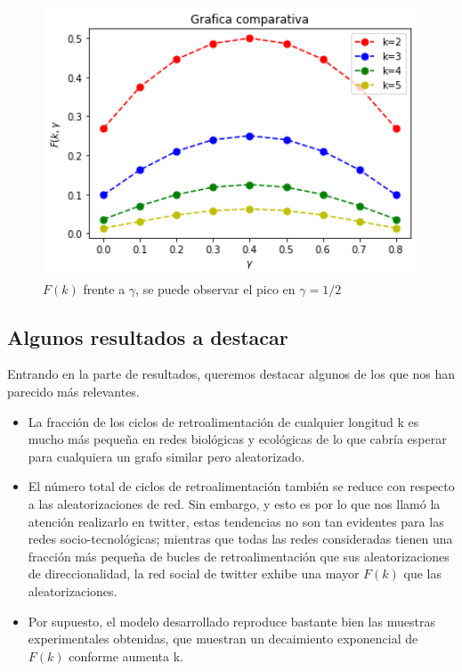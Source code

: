 \documentclass[1p]{elsarticle}
\begin{document}
\begin{figure}
	\centering
	\includegraphics[width=12cm]{graf_1.png}
	\caption{$F(k)$ frente a $\gamma$, se puede observar el pico en $\gamma=1/2$}
	\label{h}
\end{figure}




\subsection{Algunos resultados a destacar}
Entrando en la parte de resultados, queremos destacar algunos de los que nos han parecido más relevantes.
\begin{itemize}
	\item La fracción de los ciclos de retroalimentación de cualquier longitud k es mucho más pequeña en redes biológicas y ecológicas de lo que cabría esperar para cualquiera un grafo similar pero aleatorizado.
	\item El número total de ciclos de retroalimentación también se reduce 
	con respecto a las aleatorizaciones de red. Sin embargo, y esto es por lo que nos llamó la atención realizarlo en twitter, estas tendencias no son tan evidentes para las redes socio-tecnológicas; mientras que todas las redes consideradas tienen una fracción más pequeña de bucles de retroalimentación que sus aleatorizaciones de direccionalidad, la red social de twitter exhibe una mayor $F(k)$ que las aleatorizaciones.
	\item Por supuesto, el modelo desarrollado reproduce bastante bien las muestras experimentales obtenidas, que muestran un decaimiento exponencial de $F(k)$ conforme aumenta k.
\end{itemize}
\end{document}
